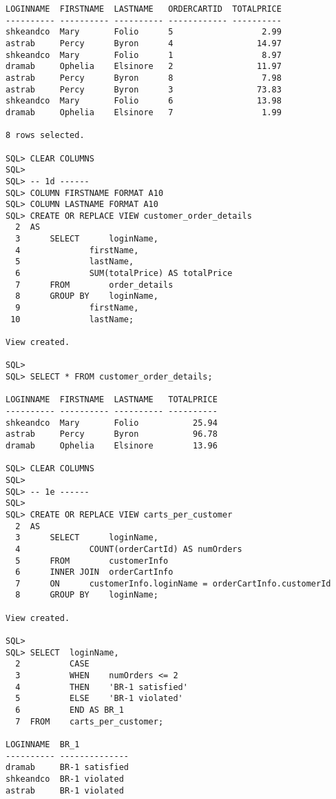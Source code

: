\documentclass{article}
\begin{document}
\begin{lstlisting}
LOGINNAME  FIRSTNAME  LASTNAME   ORDERCARTID  TOTALPRICE                        
---------- ---------- ---------- ------------ ----------                        
shkeandco  Mary       Folio      5                  2.99                        
astrab     Percy      Byron      4                 14.97                        
shkeandco  Mary       Folio      1                  8.97                        
dramab     Ophelia    Elsinore   2                 11.97                        
astrab     Percy      Byron      8                  7.98                        
astrab     Percy      Byron      3                 73.83                        
shkeandco  Mary       Folio      6                 13.98                        
dramab     Ophelia    Elsinore   7                  1.99                        

8 rows selected.

SQL> CLEAR COLUMNS
SQL> 
SQL> -- 1d ------
SQL> COLUMN FIRSTNAME FORMAT A10
SQL> COLUMN LASTNAME FORMAT A10
SQL> CREATE OR REPLACE VIEW customer_order_details
  2  AS
  3  	 SELECT      loginName,
  4  		     firstName,
  5  		     lastName,
  6  		     SUM(totalPrice) AS totalPrice
  7  	 FROM	     order_details
  8  	 GROUP BY    loginName,
  9  		     firstName,
 10  		     lastName;

View created.

SQL> 
SQL> SELECT * FROM customer_order_details;

LOGINNAME  FIRSTNAME  LASTNAME   TOTALPRICE                                     
---------- ---------- ---------- ----------                                     
shkeandco  Mary       Folio           25.94                                     
astrab     Percy      Byron           96.78                                     
dramab     Ophelia    Elsinore        13.96                                     

SQL> CLEAR COLUMNS
SQL> 
SQL> -- 1e ------
SQL> 
SQL> CREATE OR REPLACE VIEW carts_per_customer
  2  AS
  3  	 SELECT      loginName,
  4  		     COUNT(orderCartId) AS numOrders
  5  	 FROM	     customerInfo
  6  	 INNER JOIN  orderCartInfo
  7  	 ON	     customerInfo.loginName = orderCartInfo.customerId
  8  	 GROUP BY    loginName;

View created.

SQL> 
SQL> SELECT  loginName,
  2  	     CASE
  3  		 WHEN	 numOrders <= 2
  4  		 THEN	 'BR-1 satisfied'
  5  		 ELSE	 'BR-1 violated'
  6  	     END AS BR_1
  7  FROM    carts_per_customer;

LOGINNAME  BR_1                                                                 
---------- --------------                                                       
dramab     BR-1 satisfied                                                       
shkeandco  BR-1 violated                                                        
astrab     BR-1 violated                                                        


\end{lstlisting}
\end{document}
